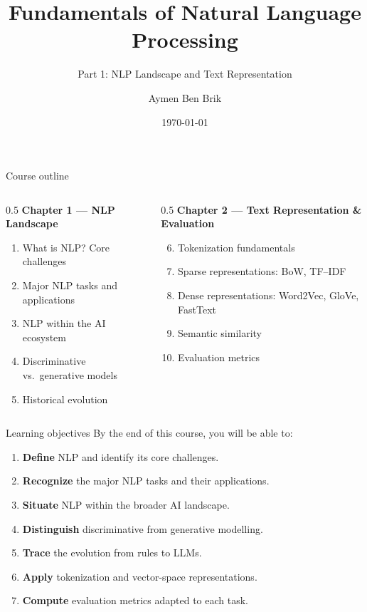\documentclass[11pt,aspectratio=169]{beamer}
\title[Fundamentals of NLP]{Fundamentals of Natural Language Processing}
\subtitle{Part 1: NLP Landscape and Text Representation}
\author{Aymen Ben Brik}
\institute{M1 GAMMA \& L2 LMAD --- Data Science}
\date{\today}
\begin{document}
\begin{frame}
\titlepage
\end{frame}

\begin{frame}{Course outline}
\begin{columns}[T]
\begin{column}{0.5\textwidth}
\textbf{Chapter 1 --- NLP Landscape}
\begin{enumerate}
    \item What is NLP? Core challenges
    \item Major NLP tasks and applications
    \item NLP within the AI ecosystem
    \item Discriminative vs.\ generative models
    \item Historical evolution
\end{enumerate}
\end{column}
\begin{column}{0.5\textwidth}
\textbf{Chapter 2 --- Text Representation \& Evaluation}
\begin{enumerate}
    \setcounter{enumi}{5}
    \item Tokenization fundamentals
    \item Sparse representations: BoW, TF--IDF
    \item Dense representations: Word2Vec, GloVe, FastText
    \item Semantic similarity
    \item Evaluation metrics
\end{enumerate}
\end{column}
\end{columns}
\end{frame}

\begin{frame}{Learning objectives}
By the end of this course, you will be able to:
\begin{enumerate}
    \item \textbf{Define} NLP and identify its core challenges.
    \item \textbf{Recognize} the major NLP tasks and their applications.
    \item \textbf{Situate} NLP within the broader AI landscape.
    \item \textbf{Distinguish} discriminative from generative modelling.
    \item \textbf{Trace} the evolution from rules to LLMs.
    \item \textbf{Apply} tokenization and vector-space representations.
    \item \textbf{Compute} evaluation metrics adapted to each task.
\end{enumerate}
\end{frame}
\end{document}
